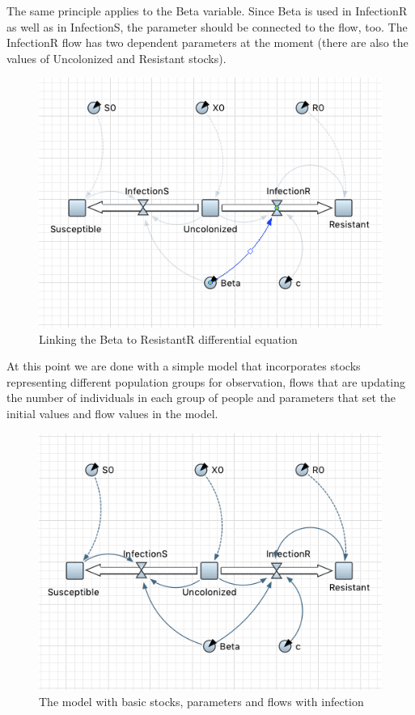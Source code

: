 The same principle applies to the Beta variable. Since Beta is used in InfectionR as well as in InfectionS, the parameter should be connected to the flow, too. The InfectionR flow has two dependent parameters at the moment (there are also the values of Uncolonized and Resistant stocks).

\begin{figure}[H]
  \centering
  \includegraphics[height=0.5\textwidth]{img/screens/basic/basic20}
  \caption{Linking the Beta to ResistantR differential equation}
\end{figure}

At this point we are done with a simple model that incorporates stocks representing different population groups for observation, flows that are updating the number of individuals in each group of people and parameters that set the initial values and flow values in the model.

\begin{figure}[H]
  \centering
  \includegraphics[height=0.5\textwidth]{img/screens/basic/basic21}
  \caption{The model with basic stocks, parameters and flows with infection}
\end{figure}